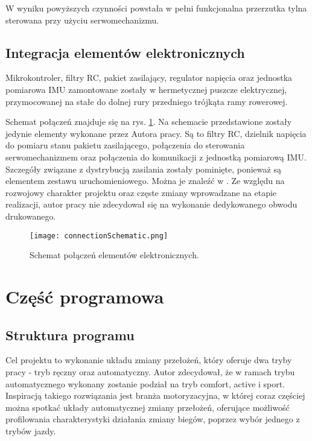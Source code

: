 W wyniku powyższych czynności powstała w pełni funkcjonalna przerzutka tylna sterowana przy użyciu serwomechanizmu. 

\subsection{Integracja elementów elektronicznych}
Mikrokontroler, filtry RC, pakiet zasilający, regulator napięcia oraz jednostka pomiarowa IMU zamontowane zostały w hermetycznej puszcze elektrycznej, przymocowanej na stałe do dolnej rury przedniego trójkąta ramy rowerowej. 

Schemat połączeń znajduje się na rys. \ref{fig:schematPolaczen}. Na schemacie przedstawione zostały jedynie elementy wykonane przez Autora pracy. Są to filtry RC, dzielnik napięcia do pomiaru stanu pakietu zasilającego, połączenia do sterowania serwomechanizmem oraz połączenia do komunikacji z jednostką pomiarową IMU. Szczegóły związane z dystrybucją zasilania zostały pominięte, ponieważ są elementem zestawu uruchomieniowego. Można je znaleźć w \cite{tivaWork}. Ze względu na rozwojowy charakter projektu oraz częste zmiany wprowadzane na etapie realizacji, autor pracy nie zdecydował się na wykonanie dedykowanego obwodu drukowanego.
\begin{figure}[h]
    \centering
    \texttt{[image: connectionSchematic.png]}
    \caption{Schemat połączeń elementów elektronicznych.}
    \label{fig:schematPolaczen}
\end{figure}

\section{Część programowa}
\subsection{Struktura programu}

Cel projektu to wykonanie układu zmiany przełożeń, który oferuje dwa tryby pracy - tryb ręczny oraz automatyczny. Autor zdecydował, że w ramach trybu automatycznego wykonany zostanie podział na tryb comfort, active i sport. Inspiracją  takiego rozwiązania jest branża motoryzacyjna, w której coraz częściej można spotkać układy automatycznej zmiany przełożeń, oferujące możliwość profilowania charakterystyki działania zmiany biegów, poprzez wybór jednego z trybów jazdy. 


